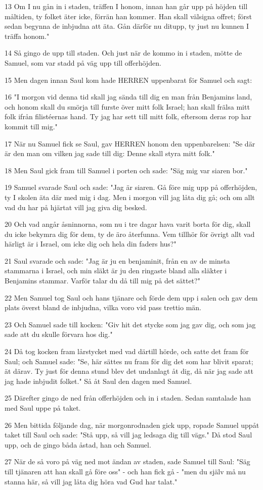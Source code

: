 \par 13 Om I nu gån in i staden, träffen I honom, innan han går upp på höjden till måltiden, ty folket äter icke, förrän han kommer. Han skall välsigna offret; först sedan begynna de inbjudna att äta. Gån därför nu ditupp, ty just nu kunnen I träffa honom."
\par 14 Så gingo de upp till staden. Och just när de kommo in i staden, mötte de Samuel, som var stadd på väg upp till offerhöjden.
\par 15 Men dagen innan Saul kom hade HERREN uppenbarat för Samuel och sagt:
\par 16 "I morgon vid denna tid skall jag sända till dig en man från Benjamins land, och honom skall du smörja till furste över mitt folk Israel; han skall frälsa mitt folk ifrån filistéernas hand. Ty jag har sett till mitt folk, eftersom deras rop har kommit till mig."
\par 17 När nu Samuel fick se Saul, gav HERREN honom den uppenbarelsen: "Se där är den man om vilken jag sade till dig: Denne skall styra mitt folk."
\par 18 Men Saul gick fram till Samuel i porten och sade: "Säg mig var siaren bor."
\par 19 Samuel svarade Saul och sade: "Jag är siaren. Gå före mig upp på offerhöjden, ty I skolen äta där med mig i dag. Men i morgon vill jag låta dig gå; och om allt vad du har på hjärtat vill jag giva dig besked.
\par 20 Och vad angår åsninnorna, som nu i tre dagar hava varit borta för dig, skall du icke bekymra dig för dem, ty de äro återfunna. Vem tillhör för övrigt allt vad härligt är i Israel, om icke dig och hela din faders hus?"
\par 21 Saul svarade och sade: "Jag är ju en benjaminit, från en av de minsta stammarna i Israel, och min släkt är ju den ringaste bland alla släkter i Benjamins stammar. Varför talar du då till mig på det sättet?"
\par 22 Men Samuel tog Saul och hans tjänare och förde dem upp i salen och gav dem plats överst bland de inbjudna, vilka voro vid pass trettio män.
\par 23 Och Samuel sade till kocken: "Giv hit det stycke som jag gav dig, och som jag sade att du skulle förvara hos dig."
\par 24 Då tog kocken fram lårstycket med vad därtill hörde, och satte det fram för Saul; och Samuel sade: "Se, här sättes nu fram för dig det som har blivit sparat; ät därav. Ty just för denna stund blev det undanlagt åt dig, då när jag sade att jag hade inbjudit folket." Så åt Saul den dagen med Samuel.
\par 25 Därefter gingo de ned från offerhöjden och in i staden. Sedan samtalade han med Saul uppe på taket.
\par 26 Men bittida följande dag, när morgonrodnaden gick upp, ropade Samuel uppåt taket till Saul och sade: "Stå upp, så vill jag ledsaga dig till vägs." Då stod Saul upp, och de gingo båda åstad, han och Samuel.
\par 27 När de så voro på väg ned mot ändan av staden, sade Samuel till Saul: "Säg till tjänaren att han skall gå före oss" - och han fick gå - "men du själv må nu stanna här, så vill jag låta dig höra vad Gud har talat."

